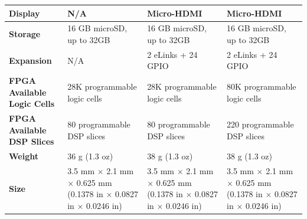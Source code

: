 \begin{table}[]
{\begin{tabular}{|p{3cm}|p{4.5cm}|p{4.5cm}|p{4.5cm}|}
            \textbf{Display}                      & N/A                                                                                   & Micro-HDMI                                                                            & Micro-HDMI                                                                            \\ \hline
            \textbf{Storage}                      & 16 GB microSD, up to 32GB                                                             & 16 GB microSD, up to 32GB                                                             & 16 GB microSD, up to 32GB                                                             \\ \hline
            \textbf{Expansion}                    & N/A                                                                                   & 2 eLinks + 24 GPIO                                                                    & 2 eLinks + 24 GPIO                                                                    \\ \hline
            \textbf{FPGA Available Logic Cells} & 28K programmable logic cells                                                          & 28K programmable logic cells                                                          & 80K programmable logic cells                                                          \\ \hline
            \textbf{FPGA Available DSP Slices}  & 80 programmable DSP slices                                                            & 80 programmable DSP slices                                                            & 220 programmable DSP slices                                                           \\ \hline
            \textbf{Weight}                       & 36 g (1.3 oz)                                                                         & 38 g (1.3 oz)                                                                         & 38 g (1.3 oz)                                                                         \\ \hline
            \textbf{Size}                         & 3.5 mm $\times$ 2.1 mm $\times$ 0.625 mm (0.1378 in $\times$ 0.0827 in $\times$ 0.0246 in)                        & 3.5 mm $\times$ 2.1 mm $\times$ 0.625 mm (0.1378 in $\times$ 0.0827 in $\times$ 0.0246 in)                        & 3.5 mm $\times$ 2.1 mm $\times$ 0.625 mm (0.1378 in $\times$ 0.0827 in $\times$ 0.0246 in)                        \\ \hline

\end{tabular}}
\end{table}
